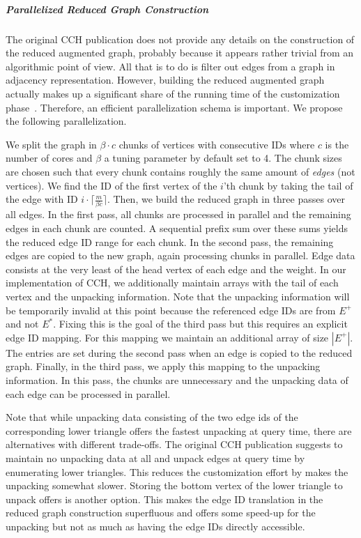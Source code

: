 \documentclass[a4paper, english, cleveref]{lipics-v2021}
\begin{document}
\subparagraph{Parallelized Reduced Graph Construction}

The original CCH publication does not provide any details on the construction of the reduced augmented graph, probably because it appears rather trivial from an algorithmic point of view.
All that is to do is filter out edges from a graph in adjacency representation.
However, building the reduced augmented graph actually makes up a significant share of the running time of the customization phase~\cite{BuchholdSW19}.
Therefore, an efficient parallelization schema is important.
We propose the following parallelization.

We split the graph in $\beta \cdot c$ chunks of vertices with consecutive IDs where $c$ is the number of cores and $\beta$ a tuning parameter by default set to 4.
The chunk sizes are chosen such that every chunk contains roughly the same amount of \emph{edges} (not vertices).
We find the ID of the first vertex of the $i$'th chunk by taking the tail of the edge with ID $i \cdot \lceil \frac{m}{\beta c} \rceil$.
Then, we build the reduced graph in three passes over all edges.
In the first pass, all chunks are processed in parallel and the remaining edges in each chunk are counted.
A sequential prefix sum over these sums yields the reduced edge ID range for each chunk.
In the second pass, the remaining edges are copied to the new graph, again processing chunks in parallel.
Edge data consists at the very least of the head vertex of each edge and the weight.
In our implementation of CCH, we additionally maintain arrays with the tail of each vertex and the unpacking information.
Note that the unpacking information will be temporarily invalid at this point because the referenced edge IDs are from $E^+$ and not $E^*$.
Fixing this is the goal of the third pass but this requires an explicit edge ID mapping.
For this mapping we maintain an additional array of size $|E^+|$.
The entries are set during the second pass when an edge is copied to the reduced graph.
Finally, in the third pass, we apply this mapping to the unpacking information.
In this pass, the chunks are unnecessary and the unpacking data of each edge can be processed in parallel.

Note that while unpacking data consisting of the two edge ids of the corresponding lower triangle offers the fastest unpacking at query time, there are alternatives with different trade-offs.
The original CCH publication suggests to maintain no unpacking data at all and unpack edges at query time by enumerating lower triangles.
This reduces the customization effort by makes the unpacking somewhat slower.
Storing the bottom vertex of the lower triangle to unpack offers is another option.
This makes the edge ID translation in the reduced graph construction superfluous and offers some speed-up for the unpacking but not as much as having the edge IDs directly accessible.
\end{document}
